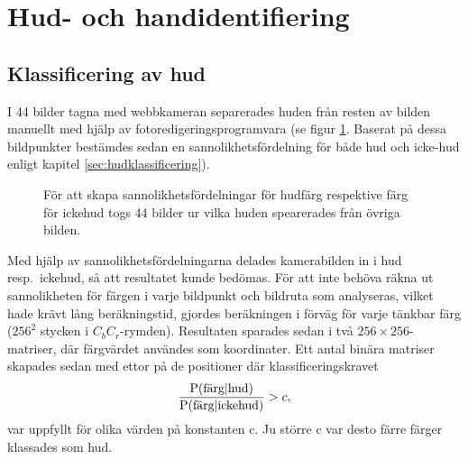 \section{Hud- och handidentifiering}

\subsection{Klassificering av hud}
I 44 bilder tagna med webbkameran separerades huden från resten av
bilden manuellt med hjälp av fotoredigeringsprogramvara (se figur
\ref{fig:hudseparerad}. Baserat på
dessa bildpunkter bestämdes sedan en sannolikhetsfördelning för både hud
och icke-hud enligt kapitel \ref{sec:hudklassificering}). 

\begin{figure}[tb]
	\centering 
	\caption{För att skapa sannolikhetsfördelningar för hudfärg
          respektive färg för ickehud togs 44 bilder ur vilka huden
          spearerades från övriga bilden.}
	\label{fig:hudseparerad}
\end{figure}


Med hjälp av
sannolikhetsfördelningarna delades kamerabilden in i hud
resp.~ickehud, så att resultatet kunde bedömas. För att inte behöva
räkna ut sannolikheten för färgen i varje bildpunkt och bildruta
som analyseras,
vilket hade krävt lång beräkningstid, gjordes beräkningen
i förväg för varje tänkbar färg ($256^2$ stycken i
$C_bC_r$-rymden). Resultaten sparades
sedan i två $256\times256$-matriser, där färgvärdet användes som
koordinater. Ett antal binära matriser skapades sedan med ettor på de
positioner där klassificeringskravet 
\begin{equation*}
	\frac{\mathrm{P}(\textrm{färg}|\textrm{hud})}{\mathrm{P}(\textrm{färg}|\textrm{ickehud})} > c,
\end{equation*}
var uppfyllt för olika värden på konstanten c. Ju större c var desto färre
färger klassades som hud. 

